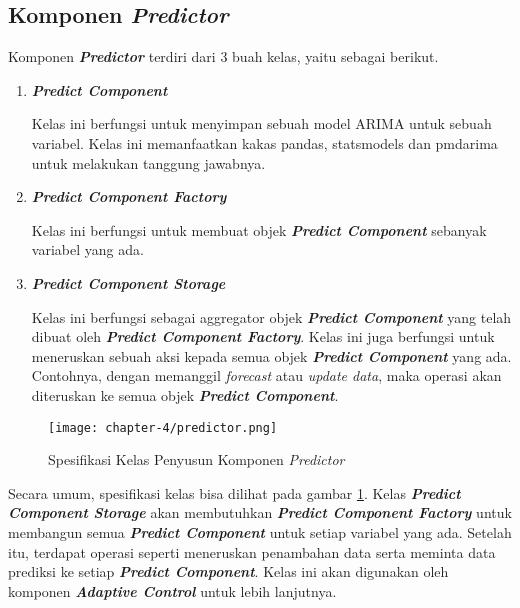 \subsection{Komponen \textit{Predictor}}
Komponen \textbf{\textit{Predictor}} terdiri dari 3 buah kelas, yaitu sebagai berikut.
\begin{enumerate}
    \item \textbf{\textit{Predict Component}}
    
    Kelas ini berfungsi untuk menyimpan sebuah model ARIMA untuk sebuah variabel. Kelas ini memanfaatkan kakas pandas, statsmodels dan pmdarima untuk melakukan tanggung jawabnya.

    \item \textbf{\textit{Predict Component Factory}}
    
    Kelas ini berfungsi untuk membuat objek \textbf{\textit{Predict Component}} sebanyak variabel yang ada. 

    \item \textbf{\textit{Predict Component Storage}}
    
    Kelas ini berfungsi sebagai aggregator objek \textbf{\textit{Predict Component}} yang telah dibuat oleh \textbf{\textit{Predict Component Factory}}. Kelas ini juga berfungsi untuk meneruskan sebuah aksi kepada semua objek \textbf{\textit{Predict Component}} yang ada. Contohnya, dengan memanggil \textit{forecast} atau \textit{update data}, maka operasi akan diteruskan ke semua objek \textbf{\textit{Predict Component}}.

\end{enumerate}

\begin{figure}[h]
    \centering
    \texttt{[image: chapter-4/predictor.png]}
    \caption{Spesifikasi Kelas Penyusun Komponen \textit{Predictor}}
    \label{fig:predictor-spek}
\end{figure}

Secara umum, spesifikasi kelas bisa dilihat pada gambar \ref{fig:predictor-spek}. Kelas \textbf{\textit{Predict Component Storage}} akan membutuhkan \textbf{\textit{Predict Component Factory}} untuk membangun semua \textbf{\textit{Predict Component}} untuk setiap variabel yang ada. Setelah itu, terdapat operasi seperti meneruskan penambahan data serta meminta data prediksi ke setiap \textbf{\textit{Predict Component}}. Kelas ini akan digunakan oleh komponen \textbf{\textit{Adaptive Control}} untuk lebih lanjutnya.

